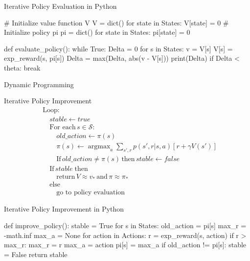 \documentclass[ignorenonframetext,xcolor=x11names]{beamer}
\begin{document}
\begin{frame}[fragile]{Iterative Policy Evaluation in Python}
\begin{pythoncode}
# Initialize value function V
V = dict()
for state in States:
    V[state] = 0
# Initialize policy pi
pi = dict()
for state in States:
    pi[state] = 0

def evaluate_policy():
    while True:
        Delta = 0
        for s in States:
            v = V[s]
            V[s] = exp_reward(s, pi[s])
            Delta = max(Delta, abs(v - V[s]))
        print(Delta)
        if Delta < theta:
            break
\end{pythoncode}
\end{frame}

\begin{frame}{Dynamic Programming}
\begin{block}{Iterative Policy Improvement}
\begin{align*}
&\text{Loop:} \\
&\quad stable \leftarrow true \\
&\quad \text{For each}\, s \in \mathcal{S}: \\
&\quad \quad old\_action \leftarrow \pi(s) \\
&\quad \quad \pi (s) \leftarrow \operatorname*{argmax}\nolimits_a \sum\nolimits_{s', r} p(s', r|s, a) [r + \gamma V(s')] \\
&\quad \quad \text{If}\, old\_action \neq \pi(s) \, \text{then} \, stable \leftarrow false \\
&\quad \text{If}\, stable \; \text{then} \\
&\quad \quad \text{return}\, V \approx v_*\, \text{and} \, \pi \approx \pi_* \\
&\quad \text{else} \\
&\quad \quad \text{go to policy evaluation}
\end{align*}
\end{block}
\end{frame}

\begin{frame}[fragile]{Iterative Policy Improvement in Python}
\begin{pythoncode}
def improve_policy():
    stable = True
    for s in States:
        old_action = pi[s]
        max_r = -math.inf
        max_a = None
        for action in Actions:
            r = exp_reward(s, action)
            if r > max_r:
                max_r = r
                max_a = action
        pi[s] = max_a
        if old_action != pi[s]:
            stable = False
    return stable
\end{pythoncode}
\end{frame}
\end{document}
